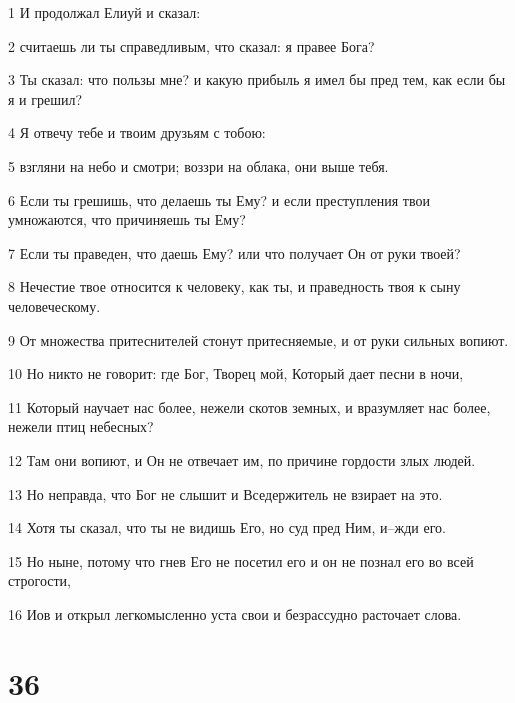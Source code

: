 \par 1 И продолжал Елиуй и сказал:
\par 2 считаешь ли ты справедливым, что сказал: я правее Бога?
\par 3 Ты сказал: что пользы мне? и какую прибыль я имел бы пред тем, как если бы я и грешил?
\par 4 Я отвечу тебе и твоим друзьям с тобою:
\par 5 взгляни на небо и смотри; воззри на облака, они выше тебя.
\par 6 Если ты грешишь, что делаешь ты Ему? и если преступления твои умножаются, что причиняешь ты Ему?
\par 7 Если ты праведен, что даешь Ему? или что получает Он от руки твоей?
\par 8 Нечестие твое относится к человеку, как ты, и праведность твоя к сыну человеческому.
\par 9 От множества притеснителей стонут притесняемые, и от руки сильных вопиют.
\par 10 Но никто не говорит: где Бог, Творец мой, Который дает песни в ночи,
\par 11 Который научает нас более, нежели скотов земных, и вразумляет нас более, нежели птиц небесных?
\par 12 Там они вопиют, и Он не отвечает им, по причине гордости злых людей.
\par 13 Но неправда, что Бог не слышит и Вседержитель не взирает на это.
\par 14 Хотя ты сказал, что ты не видишь Его, но суд пред Ним, и--жди его.
\par 15 Но ныне, потому что гнев Его не посетил его и он не познал его во всей строгости,
\par 16 Иов и открыл легкомысленно уста свои и безрассудно расточает слова.

\chapter{36}


